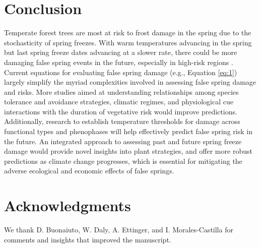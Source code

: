\documentclass{article}\usepackage[]{graphicx}\usepackage[]{color}
\begin{document}
\section*{Conclusion}
Temperate forest trees are most at risk to frost damage in the spring due to the stochasticity of spring freezes. With warm temperatures advancing in the spring but last spring freeze dates advancing at a slower rate, there could be more damaging false spring events in the future, especially in high-risk regions \citep{Gu2008, Inouye2008, Liu2018}. Current equations for evaluating false spring damage (e.g., Equation \ref{eq:1}) largely simplify the myriad complexities involved in assessing false spring damage and risks. More studies aimed at understanding relationships among species tolerance and avoidance strategies, climatic regimes, and physiological cue interactions with the duration of vegetative risk would improve predictions. Additionally, research to establish temperature thresholds for damage across functional types and phenophases will help effectively predict false spring risk in the future. An integrated approach to assessing past and future spring freeze damage would provide novel insights into plant strategies, and offer more robust predictions as climate change progresses, which is essential for mitigating the adverse ecological and economic effects of false springs.

\section*{Acknowledgments}
We thank D. Buonaiuto,  W. Daly, A. Ettinger, and I. Morales-Castilla for comments and insights that improved the manuscript. 

\nocite{Soudani2012}
\nocite{White2009}
\nocite{Schaber2005}
\nocite{Schwartz1993}
\nocite{Barker2005}
\nocite{Sanchez2013}
\nocite{Longstroth2012}
\nocite{Barlow2015}
\nocite{Longstroth2013}
\nocite{Charrier2011}

\end{document}
